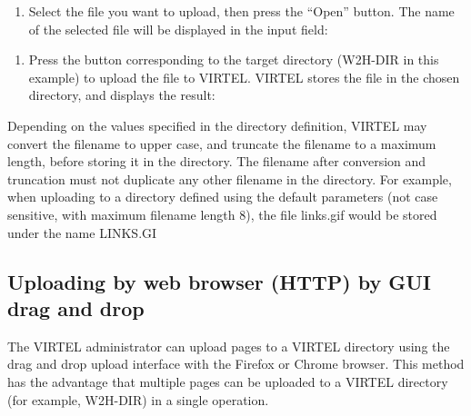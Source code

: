 \documentclass[letterpaper,10pt,english]{sphinxmanual}
\begin{document}
\begin{enumerate}
\def\theenumi{\arabic{enumi}}
\def\labelenumi{\theenumi .}
\makeatletter\def\p@enumii{\p@enumi \theenumi .}\makeatother
\setcounter{enumi}{3}
\item {} 
Select the file you want to upload, then press the “Open” button. The name of the selected file will be displayed in the input field:

\end{enumerate}


\begin{enumerate}
\def\theenumi{\arabic{enumi}}
\def\labelenumi{\theenumi .}
\makeatletter\def\p@enumii{\p@enumi \theenumi .}\makeatother
\setcounter{enumi}{4}
\item {} 
Press the button corresponding to the target directory (W2H-DIR in this example) to upload the file to VIRTEL. VIRTEL stores the file in the chosen directory, and displays the result:

\end{enumerate}



Depending on the values specified in the directory definition, VIRTEL may convert the filename to upper case, and truncate the filename to a maximum length, before storing it in the directory. The filename after conversion and truncation must not duplicate any other filename in the directory. For example, when uploading to a directory defined using the default parameters (not case sensitive, with maximum filename length 8), the file links.gif would be stored under the name LINKS.GI

\newpage

\ignorespaces 

\subsection{Uploading by web browser (HTTP) by GUI drag and drop}
\label{\detokenize{audit_operations_ and_performance:uploading-by-web-browser-http-by-gui-drag-and-drop}}\label{\detokenize{audit_operations_ and_performance:index-60}}
The VIRTEL administrator can upload pages to a VIRTEL directory using the drag and drop upload interface with the Firefox or Chrome browser. This method has the advantage that multiple pages can be uploaded to a VIRTEL directory (for example, W2H-DIR) in a single operation.
\end{document}
